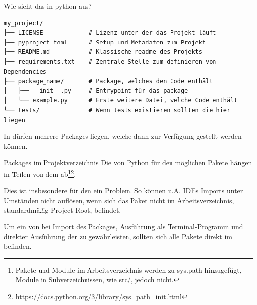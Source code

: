 \documentclass[12pt, aspectratio=169, usepdftitle=false]{beamer}
\newcommand{\pp}[1]{\lpl{#1}}
\newcommand{\furl}[1]{\footnote{\url{#1}}}
\begin{document}
\begin{frame}[fragile]{Wie sieht das in python aus?}
\begin{verbatim}
my_project/
├── LICENSE             # Lizenz unter der das Projekt läuft
├── pyproject.toml      # Setup und Metadaten zum Projekt
├── README.md           # Klassische readme des Projekts
├── requirements.txt    # Zentrale Stelle zum definieren von Dependencies
├── package_name/       # Package, welches den Code enthält
│   ├── __init__.py     # Entrypoint für das package
│   └── example.py      # Erste weitere Datei, welche Code enthält
└── tests/				# Wenn tests existieren sollten die hier liegen 
\end{verbatim}

\medskip

In  dürfen mehrere Packages liegen, welche dann zur Verfügung gestellt werden können.


\end{frame}


\begin{frame}{Packages im Projektverzeichnis}
	Die von Python für den möglichen  Pakete hängen in Teilen von dem  ab\footnote{Pakete und Module im Arbeitsverzeichnis werden zu sys.path hinzugefügt, Module in Subverzeichnissen, wie src/, jedoch nicht.}\furl{https://docs.python.org/3/library/sys_path_init.html}.
	
	\medskip
	
	Dies ist insbesondere für den  ein Problem.\newline
	\pause
	So können u.A. IDEs Imports unter Umständen nicht auflösen, wenn sich das Paket nicht im Arbeitsverzeichnis, standardmäßig Project-Root, befindet.
	
	\medskip
	\pause
	
	Um ein  von  bei
	\pause
	Import des Packages, 
	\pause 
	Ausführung als Terminal-Programm 
	\pause
	und direkter Ausführung der \pp{__init__.py}
	\pause
	zu gewährleisten, sollten sich alle  Pakete direkt im  befinden.
\end{frame}
\end{document}
